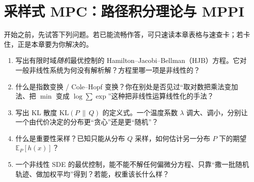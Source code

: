 \chapter{采样式 MPC：路径积分理论与 MPPI}
\label{ch:mppi}


\begin{practice}[前置自测]
开始之前，先试答下列问题。若已能流畅作答，可只速读本章表格与速查卡；若卡住，正是本章要为你解决的。
\begin{enumerate}
  \item 写出有限时域\emph{随机}最优控制的 Hamilton--Jacobi--Bellman（HJB）方程。它对一般非线性系统为何没有解析解？方程里哪一项是非线性的？
  \item 什么是指数变换 / Cole--Hopf 变换？你在别处是否见过“取对数把乘法变加法、把 $\min$ 变成 $\log\sum\exp$”这种把非线性运算线性化的手法？
  \item 写出 KL 散度 $\mathrm{KL}(P\,\|\,Q)$ 的定义式。一个温度系数 $\lambda$ 调大、调小，分别让一个由代价决定的分布更“贪心”还是更“随机”？
  \item 什么是重要性采样？已知只能从分布 $Q$ 采样，如何估计另一分布 $P$ 下的期望 $\mathbb{E}_P[h(x)]$？
  \item 一个非线性 SDE 的最优控制，能不能不解任何偏微分方程、只靠“撒一批随机轨迹、做加权平均”得到？若能，权重该长什么样？
\end{enumerate}
\end{practice}

